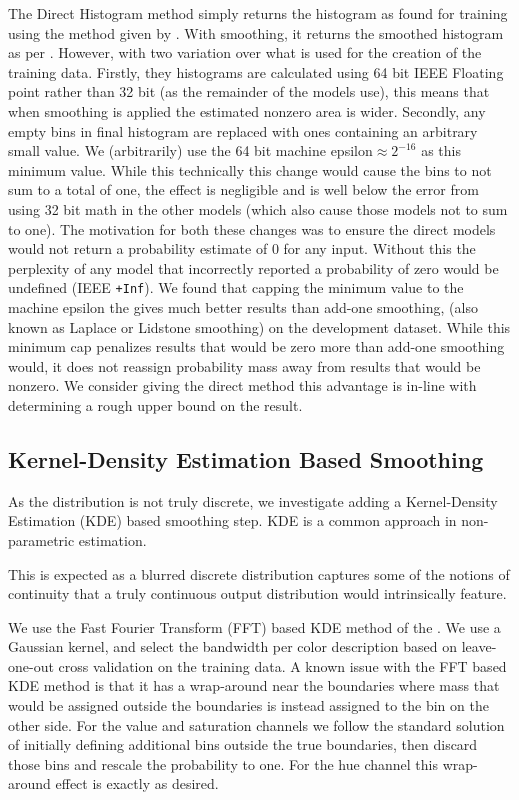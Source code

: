 

The Direct Histogram method simply returns the histogram as found for training using the method given by .
With smoothing, it returns the smoothed histogram as per .
However, with two variation over what is used for the creation of the training data.
Firstly, they histograms are calculated using 64 bit IEEE Floating point rather than 32 bit (as the remainder of the models use), this means that when smoothing is applied the estimated nonzero area is wider.
Secondly, any empty bins in final histogram are replaced with ones containing an arbitrary small value.
We (arbitrarily) use the 64 bit machine epsilon$\approx 2^{-16}$ as this minimum value.
While this technically this change would cause the bins to not sum to a total of one, the effect is negligible and is well below the error from using 32 bit math in the other models (which also cause those models not to sum to one).
The motivation for both these changes was to ensure the direct models would not return a probability estimate of 0 for any input.
Without this the perplexity of any model that incorrectly reported a probability of zero would be undefined (IEEE \texttt{+Inf}).
We found that capping the minimum value to the machine epsilon the gives much better results than add-one smoothing, (also known as  Laplace or Lidstone smoothing) on the development dataset.
While this minimum cap penalizes results that would be zero more than add-one smoothing would, it does not reassign probability mass away from results that would be nonzero.
We consider giving the direct method this advantage is in-line with determining a rough upper bound on the result.

\subsection{Kernel-Density Estimation Based Smoothing}
As the distribution is not truly discrete, we investigate adding a Kernel-Density Estimation (KDE) based smoothing step.
KDE is a common approach in non-parametric estimation.

This is expected as a blurred discrete distribution captures some of the notions of continuity that a truly continuous output distribution would intrinsically feature.


We use the Fast Fourier Transform (FFT) based KDE method of the \textcite{silverman1982algorithm}.
We use a Gaussian kernel, and select the bandwidth per color description based on leave-one-out cross validation on the training data.
A known issue with the FFT based KDE method is that it has a wrap-around near the boundaries where mass that would be assigned outside the boundaries is instead assigned to the bin on the other side.
For the value and saturation channels we follow the standard solution of initially defining additional bins outside the true boundaries, then discard those bins and rescale the probability to one.
For the hue channel this wrap-around effect is exactly as desired.

